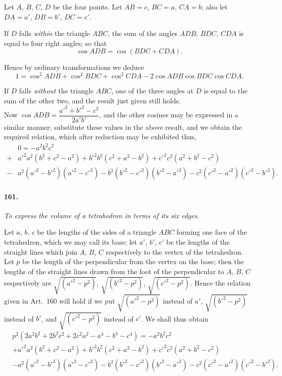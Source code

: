 \documentclass{book}[2004/02/16]
\begin{document}
\begin{mainmatter}
\begin{spacing}{1.3}
Let $A$, $B$, $C$, $D$ be the four points. Let $AB=c$, $BC=a$,
$CA=b$; also let $DA=a'$, $DB=b'$, $DC=c'$.

If $D$ falls \textit{within} the triangle $ABC$, the sum of the angles
$ADB$, $BDC$, $CDA$ is equal to four right angles; so that
\[
\cos{ADB}=\cos{(BDC+CDA)}.
\]

Hence by ordinary transformations we deduce
\[
1=\cos^2{ADB}+\cos^2{BDC}+\cos^2{CDA}-2\cos{ADB}\cos{BDC}\cos{CDA}.
\]

If $D$ falls \textit{without} the triangle $ABC$, one of the three angles
at $D$ is equal to the sum of the other two, and the result just
given still holds.\\[1ex]

Now $\cos{ADB}=\dfrac{a'^2+b'^2-c^2}{2a'b'}$, and the other cosines may be
expressed in a similar manner; substitute these values in the
above result, and we obtain the required relation, which after
reduction may be exhibited thus,
\begin{align*}
&  0=-a^2b^2c^2\\
+ &a'^2a^2(b^2+c^2-a^2)
   + b'^2b^2(c^2+a^2-b^2)
   + c'^2c^2(a^2+b^2-c^2)\\
- &a^2(a'^2-b'^2)(a'^2-c'^2)
   - b^2(b'^2-c'^2)(b'^2-a'^2)
   - c^2(c'^2-a'^2)(c'^2-b'^2).
\end{align*}

\paragraph{161.} \textit{To express the volume of a tetrahedron in terms of its
six edges.}

Let $a$, $b$, $c$ be the lengths of the sides of a triangle $ABC$
forming one face of the tetrahedron, which we may call its base;
let $a'$, $b'$, $c'$ be the lengths of the straight lines which join $A$, $B$, $C$
respectively to the vertex of the tetrahedron. Let $p$ be the length
of the perpendicular from the vertex on the base; then the lengths
of the straight lines drawn from the foot of the perpendicular to
$A$, $B$, $C$ respectively are $\surd{(a'^2-p^2)}$, $\surd{(b'^2-p^2)}$, $\surd{(c'^2-p^2)}$. Hence
the relation given in Art.~160 will hold if we put $\surd{(a'^2-p^2)}$ instead
of $a'$, $\surd{(b'^2-p^2)}$ instead of $b'$, and $\surd{(c'^2-p^2)}$ instead of $c'$.
We shall thus obtain
\begin{align*}
&p^2(2a^2b^2+2b^2c^2+2c^2a^2 -a^4-b^4-c^4) = -a^2b^2c^2\\
& + a'^2a^2(b^2+c^2-a^2)
   + b'^2b^2(c^2+a^2-b^2)
   + c'^2c^2(a^2+b^2-c^2)\\
& - a^2(a'^2-b'^2)(a'^2-c'^2)
   - b^2(b'^2-c'^2)(b'^2-a'^2)
   - c^2(c'^2-a'^2)(c'^2-b'^2).
\end{align*}


\end{spacing}
\end{mainmatter}
\end{document}
